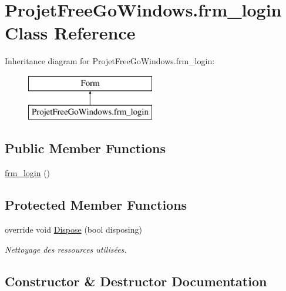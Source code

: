 \hypertarget{class_projet_free_go_windows_1_1frm__login}{}\section{Projet\+Free\+Go\+Windows.\+frm\+\_\+login Class Reference}
\label{class_projet_free_go_windows_1_1frm__login}
Inheritance diagram for Projet\+Free\+Go\+Windows.\+frm\+\_\+login\+:\begin{figure}[H]
\begin{center}
\leavevmode
\includegraphics[height=2.000000cm]{class_projet_free_go_windows_1_1frm__login}
\end{center}
\end{figure}
\subsection*{Public Member Functions}
\begin{DoxyCompactItemize}
\item 
\hyperlink{class_projet_free_go_windows_1_1frm__login_a257ca7c4663d10be8a0e723e380a41f2}{frm\+\_\+login} ()
\end{DoxyCompactItemize}
\subsection*{Protected Member Functions}
\begin{DoxyCompactItemize}
\item 
override void \hyperlink{class_projet_free_go_windows_1_1frm__login_a18f64767d510f8d6227ecb61675a2569}{Dispose} (bool disposing)
\begin{DoxyCompactList}\small\item\em Nettoyage des ressources utilisées. \end{DoxyCompactList}\end{DoxyCompactItemize}


\subsection{Constructor \& Destructor Documentation}
\mbox{\label{class_projet_free_go_windows_1_1frm__login_a257ca7c4663d10be8a0e723e380a41f2}} 
